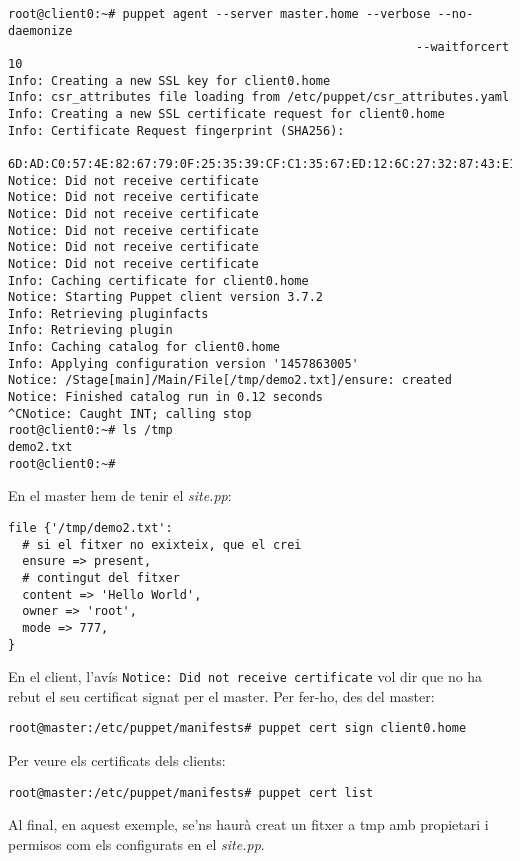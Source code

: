 \documentclass[a4paper]{article}
\begin{document}
\begin{verbatim}
root@client0:~# puppet agent --server master.home --verbose --no-daemonize 
														 --waitforcert 10
Info: Creating a new SSL key for client0.home
Info: csr_attributes file loading from /etc/puppet/csr_attributes.yaml
Info: Creating a new SSL certificate request for client0.home
Info: Certificate Request fingerprint (SHA256): 
  6D:AD:C0:57:4E:82:67:79:0F:25:35:39:CF:C1:35:67:ED:12:6C:27:32:87:43:E1:55:8F:65:D9:94:87:4B:91
Notice: Did not receive certificate
Notice: Did not receive certificate
Notice: Did not receive certificate
Notice: Did not receive certificate
Notice: Did not receive certificate
Notice: Did not receive certificate
Info: Caching certificate for client0.home
Notice: Starting Puppet client version 3.7.2
Info: Retrieving pluginfacts
Info: Retrieving plugin
Info: Caching catalog for client0.home
Info: Applying configuration version '1457863005'
Notice: /Stage[main]/Main/File[/tmp/demo2.txt]/ensure: created
Notice: Finished catalog run in 0.12 seconds
^CNotice: Caught INT; calling stop
root@client0:~# ls /tmp
demo2.txt
root@client0:~# 
\end{verbatim}
En el master hem de tenir el \textit{site.pp}:
\begin{verbatim}
file {'/tmp/demo2.txt':
  # si el fitxer no exixteix, que el crei
  ensure => present,
  # contingut del fitxer
  content => 'Hello World',
  owner => 'root',
  mode => 777,
}
\end{verbatim}
En el client, l'avís \verb+Notice: Did not receive certificate+ vol dir que no ha rebut el seu certificat signat per el master. Per fer-ho, des del master:
\begin{verbatim}
root@master:/etc/puppet/manifests# puppet cert sign client0.home
\end{verbatim}
Per veure els certificats dels clients:
\begin{verbatim}
root@master:/etc/puppet/manifests# puppet cert list
\end{verbatim}
Al final, en aquest exemple, se'ns haurà creat un fitxer a tmp amb propietari i permisos com els configurats en el \textit{site.pp}.
\end{document}
